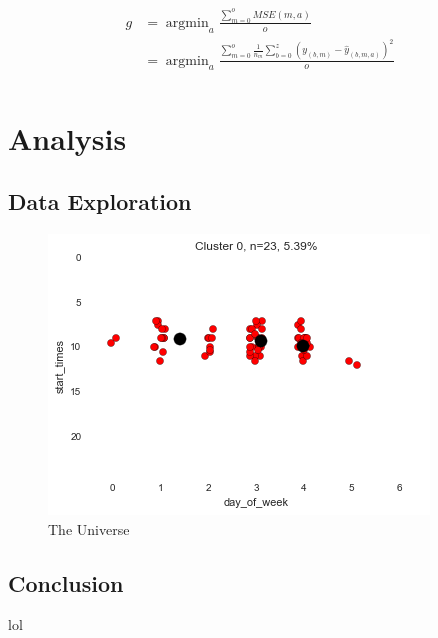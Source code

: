 \documentclass{article}
\DeclareMathOperator*{\argmin}{argmin}
\begin{document}
\begin{align}
  g &= \argmin_{a}{\frac{ \sum_{m=0}^{o}{MSE(m,a)} }{o}}\\
    &= \argmin_{a}{\frac{ \sum_{m=0}^{o}{ \frac{1}{n_m}\sum_{b=0}^{z}{(y_{(b,m)} - \hat{y}_{(b,m,a)})^2} } }{o}}\\
\end{align}

\section{Analysis}

\subsection{Data Exploration}

\begin{figure}[h!]
\centering
\includegraphics[scale=0.75]{img/2x_cluster_0_out_of_19.png}
\caption{The Universe}
\label{fig:univerise}
\end{figure}

\subsection{Conclusion}
lol



\end{document}
